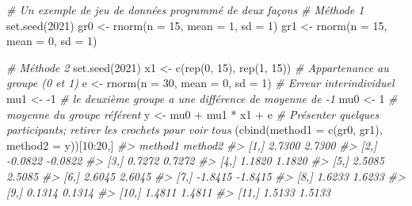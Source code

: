\documentclass[
]{book}
\newenvironment{Shaded}{}{}
\newcommand{\AttributeTok}[1]{#1}
\newcommand{\CommentTok}[1]{\textit{#1}}
\newcommand{\DecValTok}[1]{#1}
\newcommand{\FunctionTok}[1]{#1}
\newcommand{\NormalTok}[1]{#1}
\newcommand{\OtherTok}[1]{#1}
\newcommand{\SpecialCharTok}[1]{#1}
\begin{document}
\begin{Shaded}
\begin{Highlighting}[]
\CommentTok{\# Un exemple de jeu de données programmé de deux façons}
\CommentTok{\# Méthode 1}
\FunctionTok{set.seed}\NormalTok{(}\DecValTok{2021}\NormalTok{)}
\NormalTok{gr0 }\OtherTok{\textless{}{-}} \FunctionTok{rnorm}\NormalTok{(}\AttributeTok{n =} \DecValTok{15}\NormalTok{, }\AttributeTok{mean =} \DecValTok{1}\NormalTok{, }\AttributeTok{sd =} \DecValTok{1}\NormalTok{)}
\NormalTok{gr1 }\OtherTok{\textless{}{-}} \FunctionTok{rnorm}\NormalTok{(}\AttributeTok{n =} \DecValTok{15}\NormalTok{, }\AttributeTok{mean =} \DecValTok{0}\NormalTok{, }\AttributeTok{sd =} \DecValTok{1}\NormalTok{)}

\CommentTok{\# Méthode 2}
\FunctionTok{set.seed}\NormalTok{(}\DecValTok{2021}\NormalTok{)}
\NormalTok{x1 }\OtherTok{\textless{}{-}} \FunctionTok{c}\NormalTok{(}\FunctionTok{rep}\NormalTok{(}\DecValTok{0}\NormalTok{, }\DecValTok{15}\NormalTok{), }\FunctionTok{rep}\NormalTok{(}\DecValTok{1}\NormalTok{, }\DecValTok{15}\NormalTok{)) }\CommentTok{\# Appartenance au groupe (0 et 1)}
\NormalTok{e }\OtherTok{\textless{}{-}} \FunctionTok{rnorm}\NormalTok{(}\AttributeTok{n =} \DecValTok{30}\NormalTok{, }\AttributeTok{mean =} \DecValTok{0}\NormalTok{, }\AttributeTok{sd =} \DecValTok{1}\NormalTok{) }\CommentTok{\# Erreur interindividuel}
\NormalTok{mu1 }\OtherTok{\textless{}{-}} \SpecialCharTok{{-}}\DecValTok{1} \CommentTok{\# le deuxième groupe a une différence de moyenne de {-}1}
\NormalTok{mu0 }\OtherTok{\textless{}{-}} \DecValTok{1} \CommentTok{\# moyenne du groupe référent}
\NormalTok{y }\OtherTok{\textless{}{-}}\NormalTok{ mu0 }\SpecialCharTok{+}\NormalTok{ mu1 }\SpecialCharTok{*}\NormalTok{ x1 }\SpecialCharTok{+}\NormalTok{ e}
\CommentTok{\# Présenter quelques participants; retirer les crochets pour voir tous}
\NormalTok{(}\FunctionTok{cbind}\NormalTok{(}\AttributeTok{method1 =} \FunctionTok{c}\NormalTok{(gr0, gr1), }\AttributeTok{method2 =}\NormalTok{ y))[}\DecValTok{10}\SpecialCharTok{:}\DecValTok{20}\NormalTok{,]}
\CommentTok{\#\textgreater{}       method1 method2}
\CommentTok{\#\textgreater{}  [1,]  2.7300  2.7300}
\CommentTok{\#\textgreater{}  [2,] {-}0.0822 {-}0.0822}
\CommentTok{\#\textgreater{}  [3,]  0.7272  0.7272}
\CommentTok{\#\textgreater{}  [4,]  1.1820  1.1820}
\CommentTok{\#\textgreater{}  [5,]  2.5085  2.5085}
\CommentTok{\#\textgreater{}  [6,]  2.6045  2.6045}
\CommentTok{\#\textgreater{}  [7,] {-}1.8415 {-}1.8415}
\CommentTok{\#\textgreater{}  [8,]  1.6233  1.6233}
\CommentTok{\#\textgreater{}  [9,]  0.1314  0.1314}
\CommentTok{\#\textgreater{} [10,]  1.4811  1.4811}
\CommentTok{\#\textgreater{} [11,]  1.5133  1.5133}
\end{Highlighting}
\end{Shaded}
\end{document}
